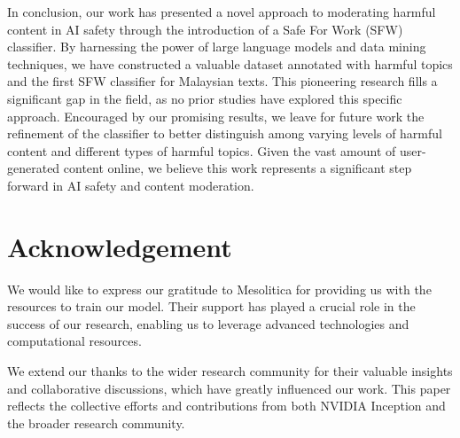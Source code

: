 \documentclass[preprint]{article}
\begin{document}
In conclusion, our work has presented a novel approach to moderating harmful content in AI safety through the introduction of a Safe For Work (SFW) classifier. By harnessing the power of large language models and data mining techniques, we have constructed a valuable dataset annotated with harmful topics and the first SFW classifier for Malaysian texts. This pioneering research fills a significant gap in the field, as no prior studies have explored this specific approach. Encouraged by our promising results, we leave for future work the refinement of the classifier to better distinguish among varying levels of harmful content and different types of harmful topics. Given the vast amount of user-generated content online, we believe this work represents a significant step forward in AI safety and content moderation.

\section{Acknowledgement}

We would like to express our gratitude to Mesolitica for providing us with the resources to train our model. Their support has played a crucial role in the success of our research, enabling us to leverage advanced technologies and computational resources.

We extend our thanks to the wider research community for their valuable insights and collaborative discussions, which have greatly influenced our work. This paper reflects the collective efforts and contributions from both NVIDIA Inception and the broader research community.

{}

\end{document}
